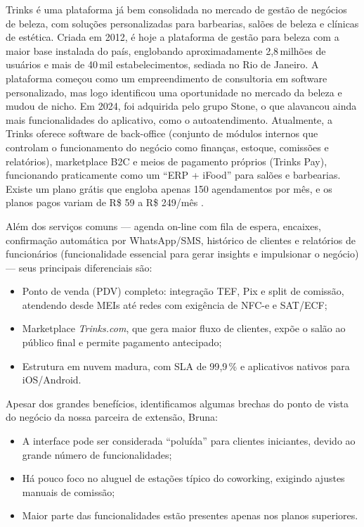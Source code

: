 Trinks é uma plataforma já bem consolidada no mercado de gestão de negócios de beleza, com soluções
personalizadas para barbearias, salões de beleza e clínicas de estética. Criada em 2012, é hoje a
plataforma de gestão para beleza com a maior base instalada do país, englobando aproximadamente
2,8\,milhões de usuários e mais de 40\,mil estabelecimentos, sediada no Rio de Janeiro. A plataforma começou como um empreendimento de consultoria em software personalizado, mas logo identificou uma oportunidade no mercado da beleza e mudou de nicho. Em 2024, foi adquirida pelo grupo Stone, o que alavancou ainda mais funcionalidades do aplicativo, como o autoatendimento.
Atualmente, a Trinks oferece software de back-office (conjunto de módulos internos que controlam o funcionamento do negócio como finanças, estoque, comissões e relatórios), marketplace B2C e meios de pagamento próprios (Trinks Pay), funcionando praticamente como um “ERP + iFood” para salões e barbearias. Existe um
plano grátis que engloba apenas 150 agendamentos por mês, e os planos pagos variam de R\$ 59 a R\$ 249/mês \cite{Trinks}.

Além dos serviços comuns — agenda on-line com fila de espera, encaixes, confirmação automática por
WhatsApp/SMS, histórico de clientes e relatórios de funcionários (funcionalidade essencial para
gerar insights e impulsionar o negócio) — seus principais diferenciais são:

\begin{itemize}
	\item Ponto de venda (PDV) completo: integração TEF, Pix e split de comissão, atendendo desde
	MEIs até redes com exigência de NFC-e e SAT/ECF;
	\item Marketplace \textit{Trinks.com}, que gera maior fluxo de clientes, expõe o salão ao
	público final e permite pagamento antecipado;
	\item Estrutura em nuvem madura, com SLA de 99{,}9\,\% e aplicativos nativos para
	iOS/Android.
\end{itemize}

Apesar dos grandes benefícios, identificamos algumas brechas do ponto de vista do negócio da nossa
parceira de extensão, Bruna:

\begin{itemize}
	\item A interface pode ser considerada “poluída” para clientes iniciantes, devido ao grande
	número de funcionalidades;
	\item Há pouco foco no aluguel de estações típico do coworking, exigindo ajustes manuais de
	comissão;
	\item Maior parte das funcionalidades estão presentes apenas nos planos superiores.
\end{itemize}


